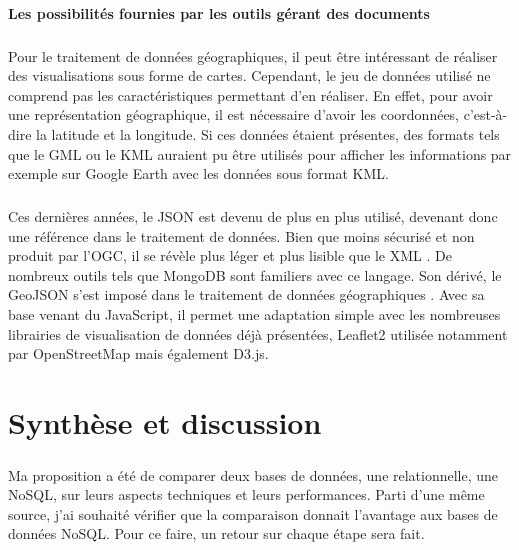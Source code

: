 \subsubsection{Les possibilités fournies par les outils gérant des documents}
\paragraph{}Pour le traitement de données géographiques, il peut être intéressant de réaliser des visualisations sous forme de cartes. Cependant, le jeu de données utilisé ne comprend pas les caractéristiques permettant d'en réaliser. En effet, pour avoir une représentation géographique, il est nécessaire d'avoir les coordonnées, c'est-à-dire la latitude et la longitude. Si ces données étaient présentes, des formats tels que le \acrfull{GML} ou le \acrfull{KML} auraient pu être utilisés pour afficher les informations par exemple sur Google Earth avec les données sous format \acrshort{KML}.

\paragraph{}Ces dernières années, le \acrshort{JSON} est devenu de plus en plus utilisé, devenant donc une référence dans le traitement de données. Bien que moins sécurisé et non produit par l'\acrshort{OGC}, il se révèle plus léger et plus lisible que le XML \cite{xmljsoncomparison}. De nombreux outils tels que MongoDB sont familiers avec ce langage. Son dérivé, le GeoJSON s'est imposé dans le traitement de données géographiques \cite{geojsonxml}. Avec sa base venant du JavaScript, il permet une adaptation simple avec les nombreuses librairies de visualisation de données déjà présentées, Leaflet2 utilisée notamment par OpenStreetMap mais également D3.js.


\chapter{Synthèse et discussion}

\paragraph{}Ma proposition a été de comparer deux bases de données, une relationnelle, une NoSQL, sur leurs aspects techniques et leurs performances. Parti d'une même source, j'ai souhaité vérifier que la comparaison donnait l'avantage aux bases de données NoSQL. Pour ce faire, un retour sur chaque étape sera fait.


